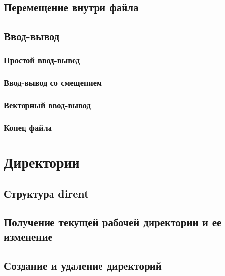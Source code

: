 \documentclass[oneside]{book}
\begin{document}
		\section{Перемещение внутри файла}
		
		
		\section{Ввод-вывод}
		
	
			\subsection{Простой ввод-вывод}
			
			
			\subsection{Ввод-вывод со смещением}
			
			
			\subsection{Векторный ввод-вывод}
			
			
		\subsection{Конец файла}
		
		
	\chapter{Директории}
		
	
		\section{Структура dirent}
		
		
		\section{Получение текущей рабочей директории и ее изменение}
			
		
		\section{Создание и удаление директорий}
			
		
\end{document}
